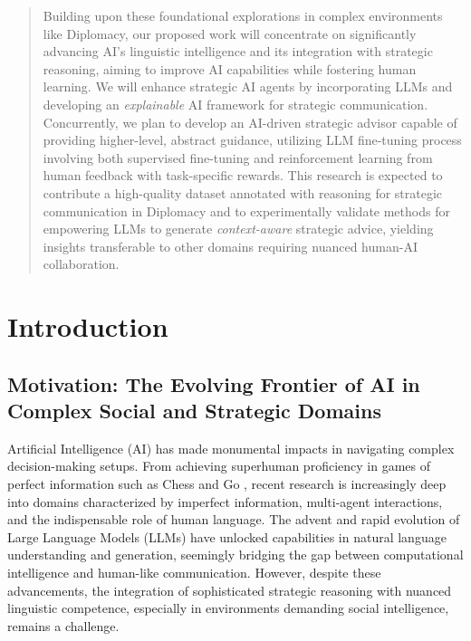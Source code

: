 \documentclass[oneside]{memoir}
\begin{document}
\begin{abstract}
Building upon these foundational explorations in complex environments like Diplomacy, our proposed work will concentrate on significantly advancing AI’s linguistic intelligence and its integration with strategic reasoning, aiming to improve AI capabilities while fostering human learning. We will enhance strategic AI agents by incorporating LLMs and developing an \textit{explainable} AI framework for strategic communication. Concurrently, we plan to develop an AI-driven strategic advisor capable of providing higher-level, abstract guidance, utilizing LLM fine-tuning process involving both supervised fine-tuning and reinforcement learning from human feedback with task-specific rewards. This research is expected to contribute a high-quality dataset annotated with  reasoning for strategic communication in Diplomacy and to experimentally validate methods for empowering LLMs to generate \textit{context-aware} strategic advice, yielding insights transferable to other domains requiring nuanced human-AI collaboration.

\end{abstract}

\SingleSpacing

\newpage
\setcounter{tocdepth}{3}
\tableofcontents

\newpage
\listoffigures

\DoubleSpacing

%
%

\chapter{Introduction}
\section{Motivation: The Evolving Frontier of AI in Complex Social and Strategic Domains}

Artificial Intelligence (AI) has made monumental impacts in navigating complex decision-making setups. From achieving superhuman proficiency in games of perfect information such as Chess \citep{campbell2002deepblue} and Go \citep{Silver2016MasteringTG}, recent research is increasingly deep into domains characterized by imperfect information, multi-agent interactions, and the indispensable role of human language. The advent and rapid evolution of Large Language Models (LLMs) \citep{Brown2020fewshot,Achiam2023GPT4TR} have unlocked capabilities in natural language understanding and generation, seemingly bridging the gap between computational intelligence and human-like communication. However, despite these advancements, the integration of sophisticated strategic reasoning with nuanced linguistic competence, especially in environments demanding social intelligence, remains a challenge.
\end{document}
